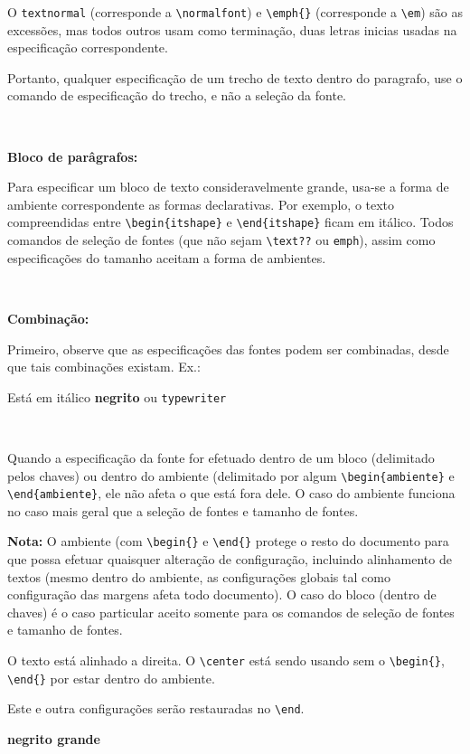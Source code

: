 \documentclass[12pt,a4paper]{article}
\begin{document}
O \verb|textnormal| (corresponde a \verb|\normalfont|) e
 \verb|\emph{}| (corresponde a \verb|\em|) 
são as excessões, mas todos outros usam como terminação, 
duas letras inicias usadas na especificação correspondente.

Portanto, qualquer especificação de um trecho de texto dentro do paragrafo, 
use o comando de especificação do trecho, e não a seleção da fonte.

\

{\bfseries Bloco de parâgrafos:}

Para especificar um bloco de texto consideravelmente grande, 
usa-se a forma de ambiente correspondente 
as formas declarativas. 
Por exemplo, o texto compreendidas entre 
\verb|\begin{itshape}| e \verb|\end{itshape}| ficam em itálico.
 Todos comandos de seleção de fontes (que não sejam \verb+\text??+ ou \verb+emph+), assim como especificações do tamanho aceitam a 
 forma de ambientes.

\

{\bfseries Combinação:}

Primeiro, observe que as especificações das fontes podem ser combinadas, 
desde que tais combinações existam.
Ex.: 
\begin{itshape} 
  Está em itálico \textbf{negrito} ou \texttt{typewriter} 
\end{itshape}

\

Quando a especificação da fonte for efetuado dentro de um bloco 
(delimitado pelos chaves) ou dentro do ambiente 
(delimitado por algum \verb|\begin{ambiente}| e \verb|\end{ambiente}|, 
ele não afeta o que está fora dele. 
O caso do ambiente funciona no caso mais geral que a seleção de fontes
e tamanho de fontes. 

\textbf{Nota:} O ambiente (com \verb+\begin{}+ e \verb+\end{}+
protege o resto do documento para que possa efetuar quaisquer 
alteração de configuração, incluindo alinhamento de textos 
(mesmo dentro do ambiente, as configurações globais tal como 
configuração das margens afeta todo documento). 
O caso do bloco (dentro de chaves) é o caso particular aceito
somente para os comandos de seleção de fontes e tamanho de fontes.


\begin{flushright} 
  O texto está alinhado a direita.
  \center O \verb+\center+ está sendo usando sem o \verb|\begin{}|, \verb|\end{}| 
  por estar dentro do ambiente.
  
  Este e outra configurações serão restauradas no \verb|\end|.

  \flushleft \bfseries \Large negrito grande
\end{flushright}
\end{document}
